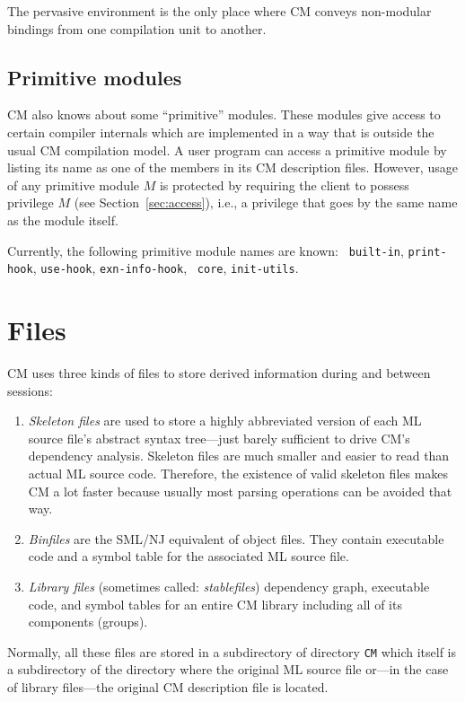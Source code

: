 \documentclass{article}
\begin{document}
The pervasive environment is the only place where CM conveys
non-modular bindings from one compilation unit to another.

\subsection{Primitive modules}

CM also knows about some ``primitive'' modules.  These modules give
access to certain compiler internals which are implemented in a way
that is outside the usual CM compilation model.  A user program can
access a primitive module by listing its name as one of the members in
its CM description files.  However, usage of any primitive module $M$
is protected by requiring the client to possess  privilege $M$
(see Section~\ref{sec:access}), i.e., a privilege that goes by the
same name as the module itself.

Currently, the following primitive module names are known: {\tt
built-in}, {\tt print-hook}, {\tt use-hook}, {\tt exn-info-hook}, {\tt
core}, {\tt init-utils}.

\section{Files}

CM uses three kinds of files to store derived information during and
between sessions:

\begin{enumerate}
\item {\it Skeleton files} are used to store a highly abbreviated
version of each ML source file's abstract syntax tree---just barely
sufficient to drive CM's dependency analysis.  Skeleton files are much
smaller and easier to read than actual ML source code.  Therefore, the
existence of valid skeleton files makes CM a lot faster because
usually most parsing operations can be avoided that way.
\item {\it Binfiles} are the SML/NJ equivalent of object files.  They
contain executable code and a symbol table for the associated ML
source file.
\item {\it Library files} (sometimes called: {\em stablefiles})
dependency graph, executable code, and symbol tables for an entire CM
library including all of its components (groups).
\end{enumerate}

Normally, all these files are stored in a subdirectory of directory
{\tt CM} which itself is a subdirectory of the directory where the
original ML source file or---in the case of library files---the
original CM description file is located.
\end{document}
